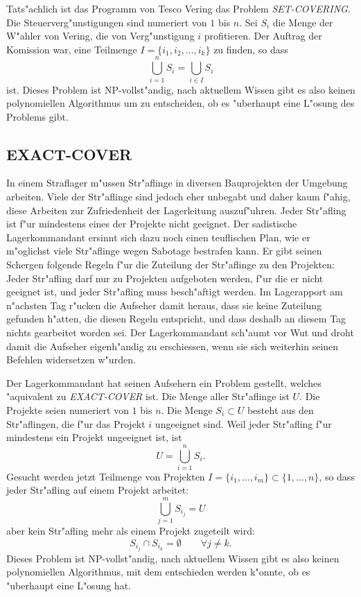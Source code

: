 \medskip

Tats"achlich ist das Programm von Tesco Vering das Problem {\it SET-COVERING}.
Die Steuerverg"unstigungen sind numeriert von $1$ bis $n$.
Sei $S_i$ die Menge der W"ahler von Vering, die von Verg"unstigung $i$
profitieren. Der Auftrag der Komission war, eine Teilmenge
$I=\{i_1,i_2,\dots,i_k\}$ zu finden, so dass
\[
\bigcup_{i=1}^nS_i=\bigcup_{i\in I}S_i
\]
ist.
Dieses Problem ist NP-vollst"andig, nach aktuellem Wissen gibt
es also keinen polynomiellen Algorithmus um zu entscheiden, ob es
"uberhaupt eine L"osung des Problems gibt.

\subsection{EXACT-COVER}
In einem Straflager m"ussen Str"aflinge in diversen Bauprojekten
der Umgebung arbeiten.
Viele der Str"aflinge sind jedoch eher unbegabt und daher kaum
f"ahig, diese Arbeiten zur Zufriedenheit der Lagerleitung auszuf"uhren.
Jeder Str"afling ist f"ur mindestens eines der Projekte nicht geeignet.
Der sadistische Lagerkommandant ersinnt sich dazu noch einen teuflischen
Plan, wie er m"oglichst viele Str"aflinge wegen Sabotage bestrafen kann.
Er gibt seinen Schergen folgende Regeln f"ur die Zuteilung der Str"aflinge
zu den Projekten: Jeder Str"afling darf nur zu Projekten aufgeboten werden,
f"ur die er nicht geeignet ist, und jeder Str"afling muss besch"aftigt
werden.
Im Lagerapport am n"achsten Tag r"ucken die Aufseher damit heraus, dass
sie keine Zuteilung gefunden h"atten, die diesen Regeln entspricht, und
dass deshalb an diesem Tag nichts gearbeitet worden sei.
Der Lagerkommandant sch"aumt vor Wut und droht damit die Aufseher eigenh"andig
zu erschiessen, wenn sie sich weiterhin seinen Befehlen widersetzen
w"urden.

\medskip

Der Lagerkommandant hat seinen Aufsehern ein Problem gestellt, welches
"aquivalent zu {\it EXACT-COVER} ist.
Die Menge aller Str"aflinge ist $U$.
Die Projekte seien numeriert
von $1$ bis $n$. Die Menge $S_i\subset U$ besteht aus den Str"aflingen, die
f"ur das Projekt $i$ ungeeignet sind. Weil jeder Str"afling f"ur mindestens
ein Projekt ungeeignet ist, ist 
\[
U=\bigcup_{i=1}^n S_i.
\]
Gesucht werden jetzt Teilmenge von Projekten
$I=\{i_1,\dots,i_m\}\subset\{1,\dots,n\}$, so dass 
jeder Str"afling auf einem Projekt arbeitet:
\[
\bigcup_{j=1}^m S_{i_j}=U
\]
aber kein Str"afling mehr als einem Projekt zugeteilt wird:
\[
S_{i_j}\cap S_{i_k}=\emptyset\qquad \forall j\ne k.
\]
Dieses Problem ist NP-vollst"andig, nach aktuellem Wissen gibt es
also keinen polynomiellen Algorithmus, mit dem entschieden werden
k"onnte, ob es "uberhaupt eine L"osung hat.

